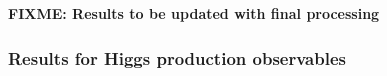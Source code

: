 \textbf{FIXME: Results to be updated with final processing}

\subsubsection{Results for Higgs production observables}

%
